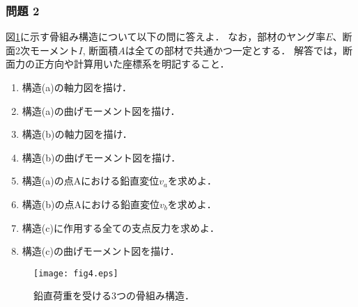 \documentclass[10pt,a4j]{jarticle}
\begin{document}
\subsubsection*{問題 2}
図\ref{fig:fig4}に示す骨組み構造について以下の問に答えよ． 
なお，部材のヤング率$E$、断面2次モーメント$I$, 断面積$A$は全ての部材で共通かつ一定とする．
解答では，断面力の正方向や計算用いた座標系を明記すること．
\begin{enumerate}
\item
	構造(a)の軸力図を描け．
\item
	構造(a)の曲げモーメント図を描け．
\item
	構造(b)の軸力図を描け．
\item
	構造(b)の曲げモーメント図を描け．
\item
	構造(a)の点Aにおける鉛直変位$v_a$を求めよ．
\item
	構造(b)の点Aにおける鉛直変位$v_b$を求めよ．
\item
	構造(c)に作用する全ての支点反力を求めよ．
\item
	構造(c)の曲げモーメント図を描け．
\end{enumerate}
\begin{figure}[h]
	\begin{center}
	\texttt{[image: fig4.eps]} 
	\end{center}
	\caption{鉛直荷重を受ける3つの骨組み構造．} 
	\label{fig:fig4}
\end{figure}
\end{document}
